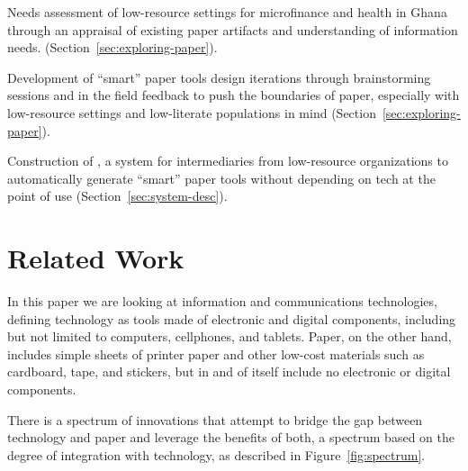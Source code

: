 \documentclass{sig-alternate}
\begin{document}
\begin{compactitem}

  \item Needs assessment of low-resource settings for microfinance and health in Ghana through an appraisal of existing paper artifacts and understanding of information needs. (Section~\ref{sec:exploring-paper}).
  \item Development of ``smart'' paper tools design iterations through brainstorming sessions and in the field feedback to push the boundaries of paper, especially with low-resource settings and low-literate populations in mind (Section~\ref{sec:exploring-paper}).
  \item Construction of \nifty, a system for intermediaries from low-resource organizations to automatically generate ``smart'' paper tools without depending on tech at the point of use (Section~\ref{sec:system-desc}).

\end{compactitem}


\section{Related Work}
\label{sec:related}

In this paper we are looking at information and communications technologies, defining technology as tools made of electronic and digital components, including but not limited to computers, cellphones, and tablets. Paper, on the other hand, includes simple sheets of printer paper and other low-cost materials such as cardboard, tape, and stickers, but in and of itself include no electronic or digital components. 

There is a spectrum of innovations that attempt to bridge the gap between technology and paper and leverage the benefits of both, a spectrum based on the degree of integration with technology, as described in Figure~\ref{fig:spectrum}.
\end{document}
